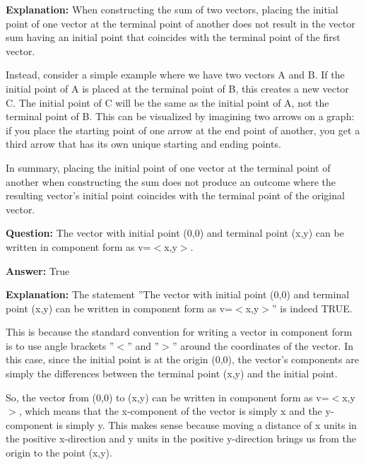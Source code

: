 \documentclass{article}
\begin{document}
                \textbf{Explanation:} When constructing the sum of two vectors, placing the initial point of one vector at the terminal point of another does not result in the vector sum having an initial point that coincides with the terminal point of the first vector.

Instead, consider a simple example where we have two vectors A and B. If the initial point of A is placed at the terminal point of B, this creates a new vector C. The initial point of C will be the same as the initial point of A, not the terminal point of B. This can be visualized by imagining two arrows on a graph: if you place the starting point of one arrow at the end point of another, you get a third arrow that has its own unique starting and ending points.

In summary, placing the initial point of one vector at the terminal point of another when constructing the sum does not produce an outcome where the resulting vector's initial point coincides with the terminal point of the original vector.
                
                \vspace{0.5cm} 
        
            
                \textbf {Question:} The vector with initial point (0,0) and terminal point (x,y) can be written in component form as v=\ensuremath{<}x,y\ensuremath{>}.
                
                \textbf{Answer:} True

                \textbf{Explanation:} The statement ''The vector with initial point (0,0) and terminal point (x,y) can be written in component form as v=\ensuremath{<}x,y\ensuremath{>}'' is indeed TRUE.

This is because the standard convention for writing a vector in component form is to use angle brackets ''\ensuremath{<}'' and ''\ensuremath{>}'' around the coordinates of the vector. In this case, since the initial point is at the origin (0,0), the vector's components are simply the differences between the terminal point (x,y) and the initial point.

So, the vector from (0,0) to (x,y) can be written in component form as v=\ensuremath{<}x,y\ensuremath{>}, which means that the x-component of the vector is simply x and the y-component is simply y. This makes sense because moving a distance of x units in the positive x-direction and y units in the positive y-direction brings us from the origin to the point (x,y).
                
\end{document}
